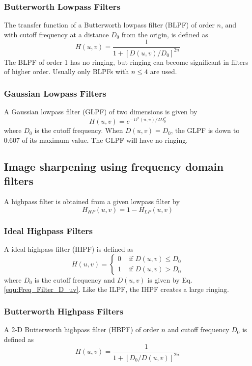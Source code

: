 \subsubsection{Butterworth Lowpass Filters}
The transfer function of a Butterworth lowpass filter (BLPF) of order $n$, and with cutoff frequency at a distance $D_0$ from the origin, is defined as
\begin{equation}
	H(u,v) = \frac{1}{1 + \left[ D(u,v) / D_0 \right]^{2n}}
\end{equation}
The BLPF of order 1 has no ringing, but ringing can become significant in filters of higher order. Usually only BLPFs with $n \leq 4$ are used.

\subsubsection{Gaussian Lowpass Filters}
A Gaussian lowpass filter (GLPF) of two dimensions is given by
\begin{equation}
	H(u,v) = e^{-D^2(u,v)/2D_0^2}
\end{equation}
where $D_0$ is the cutoff frequency. When $D(u,v)=D_0$, the GLPF is down to $0.607$ of its maximum value. The GLPF will have no ringing.

\subsection{Image sharpening using frequency domain filters }
A highpass filter is obtained from a given lowpass filter by
\begin{equation}
	H_{HP}(u,v) = 1 - H_{LP}(u,v)
\end{equation}

\subsubsection{Ideal Highpass Filters}
A ideal highpass filter (IHPF) is defined as
\begin{equation}
	H(u,v) = 
		\begin{cases}
			0 & \text{  if } D(u,v) \leq D_0 \\
			1 & \text{  if } D(u,v) > D_0
		\end{cases}
\end{equation}
where $D_0$ is the cutoff frequency and $D(u,v)$ is given by Eq. \ref{equ:Freq_Filter_D_uv}. Like the ILPF, the IHPF creates a large ringing.

\subsubsection{Butterworth Highpass Filters}
A 2-D Butterworth highpass filter (HBPF) of order $n$ and cutoff frequency $D_0$ is defined as 
\begin{equation}
	H(u,v) = \frac{1}{1 + \left[ D_0 / D(u,v) \right]^{2n}}
\end{equation}

